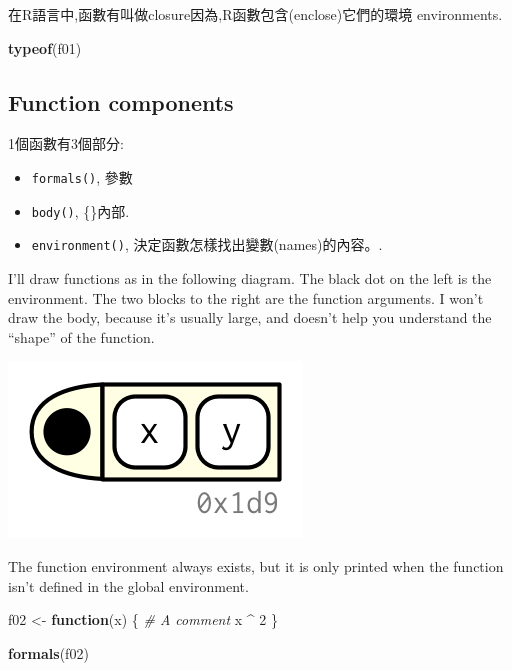 \documentclass[]{book}
\newenvironment{Shaded}{\begin{snugshade}}{\end{snugshade}}
\newcommand{\KeywordTok}[1]{\textcolor[rgb]{0.13,0.29,0.53}{\textbf{#1}}}
\newcommand{\DecValTok}[1]{\textcolor[rgb]{0.00,0.00,0.81}{#1}}
\newcommand{\StringTok}[1]{\textcolor[rgb]{0.31,0.60,0.02}{#1}}
\newcommand{\CommentTok}[1]{\textcolor[rgb]{0.56,0.35,0.01}{\textit{#1}}}
\newcommand{\ControlFlowTok}[1]{\textcolor[rgb]{0.13,0.29,0.53}{\textbf{#1}}}
\newcommand{\OperatorTok}[1]{\textcolor[rgb]{0.81,0.36,0.00}{\textbf{#1}}}
\newcommand{\NormalTok}[1]{#1}
\theoremstyle{definition}
\theoremstyle{definition}
\theoremstyle{definition}
\theoremstyle{remark}
\begin{document}
在R語言中,函數有叫做closure因為,R函數包含(enclose)它們的環境
environments.

\begin{Shaded}
\begin{Highlighting}[]
\KeywordTok{typeof}\NormalTok{(f01)}
\end{Highlighting}
\end{Shaded}

\subsection{Function components}\label{function-components}

1個函數有3個部分:

\begin{itemize}
\item
  \texttt{formals()}, 參數
\item
  \texttt{body()}, \{\}內部.
\item
  \texttt{environment()}, 決定函數怎樣找出變數(names)的內容。.
\end{itemize}

I'll draw functions as in the following diagram. The black dot on the
left is the environment. The two blocks to the right are the function
arguments. I won't draw the body, because it's usually large, and
doesn't help you understand the ``shape'' of the function.

\begin{center}\includegraphics{diagrams/functions/components} \end{center}

The function environment always exists, but it is only printed when the
function isn't defined in the global environment.

\begin{Shaded}
\begin{Highlighting}[]
\NormalTok{f02 <-}\StringTok{ }\ControlFlowTok{function}\NormalTok{(x) \{}
  \CommentTok{# A comment}
\NormalTok{  x }\OperatorTok{^}\StringTok{ }\DecValTok{2}
\NormalTok{\}}

\KeywordTok{formals}\NormalTok{(f02)}
\end{Highlighting}
\end{Shaded}
\end{document}
